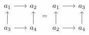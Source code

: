 \documentclass{article}
\begin{document}
\[
\begin{tikzcd}[column sep=scriptsize]
a_1 \arrow[r] & a_2 \\
a_3 \arrow[u] \arrow[r] & a_4 \arrow[u]
\end{tikzcd}
=
\begin{tikzcd}[column sep=scriptsize]
a_1 \arrow[r] & a_3 \\
a_2 \arrow[u] \arrow[r] & a_4 \arrow[u]
\end{tikzcd}
\]
\end{document}
